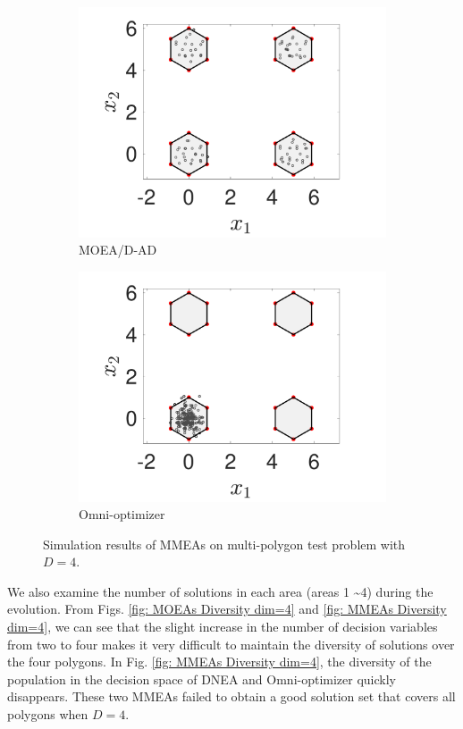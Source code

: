 \documentclass[conference]{IEEEtran}
\begin{document}
\begin{figure}[t!]
    \begin{subfigure}[b]{.24\textwidth}
    \includegraphics[width=\linewidth]{Section5/dim4/PS/MOEADAD}
    \caption{MOEA/D-AD}
    \end{subfigure}
    \begin{subfigure}[b]{.24\textwidth}
    \includegraphics[width=\linewidth]{Section5/dim4/PS/OmniOptimizer}
    \caption{Omni-optimizer}
    \end{subfigure}
    \caption{Simulation results of MMEAs on multi-polygon test problem with $D=4$.}
    \label{fig: MMEAs PS dim=4}
\end{figure}

We also examine the number of solutions in each area (areas 1 \textasciitilde 4) during the evolution. From Figs. \ref{fig: MOEAs Diversity dim=4} and \ref{fig: MMEAs Diversity dim=4}, we can see that the slight increase in the number of decision variables from two to four makes it very difficult to maintain the diversity of solutions over the four polygons. In Fig. \ref{fig: MMEAs Diversity dim=4}, the diversity of the population in the decision space of DNEA and Omni-optimizer quickly disappears. These two MMEAs failed to obtain a good solution set that covers all polygons when $D=4$. 
\end{document}
